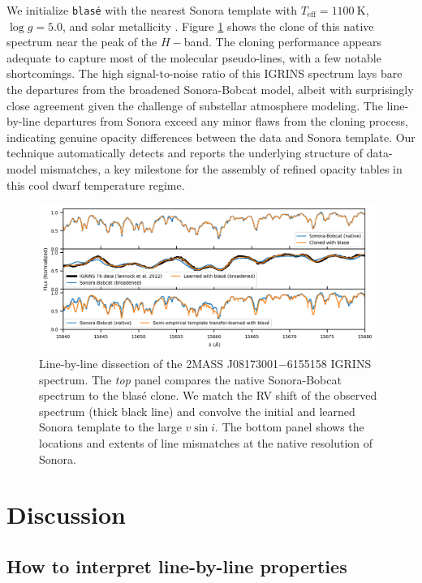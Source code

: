 \documentclass[twocolumn]{aastex631}
\begin{document}
We initialize \texttt{blas\'e} with the nearest Sonora template with $T_\mathrm{eff} = 1100~\text{K}$, $\log{g}=5.0$, and solar metallicity \citep{2022MNRAS.tmp.1421T}.  Figure \ref{fig_IGRINS_sonora_demo} shows the clone of this native spectrum near the peak of the $H-$band. The cloning performance appears adequate to capture most of the molecular pseudo-lines, with a few notable shortcomings. The high signal-to-noise ratio of this IGRINS spectrum lays bare the departures from the broadened Sonora-Bobcat model, albeit with surprisingly close agreement given the challenge of substellar atmosphere modeling.  The line-by-line departures from Sonora exceed any minor flaws from the cloning process, indicating genuine opacity differences between the data and Sonora template.  Our technique automatically detects and reports the underlying structure of data-model mismatches, a key milestone for the assembly of refined opacity tables in this cool dwarf temperature regime.

\begin{figure}[hbt!]
    \centering
    \includegraphics[width=0.98\textwidth]{IGRINS_T6_sonora_demo.png}
    \caption{Line-by-line dissection of the 2MASS J08173001$-$6155158 IGRINS spectrum.  The \emph{top} panel compares the native Sonora-Bobcat spectrum to the blas\'e clone.  We match the RV shift of the observed spectrum (thick black line) and convolve the initial and learned Sonora template to the large $v\sin{i}$.  The bottom panel shows the locations and extents of line mismatches at the native resolution of Sonora.}
    \label{fig_IGRINS_sonora_demo}
\end{figure}


\section{Discussion}\label{secDiscuss}

\subsection{How to interpret line-by-line properties}
\end{document}
